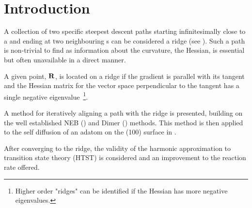 \section{Introduction}
\label{sec:erm-introduction}

A collection of two specific steepest descent paths starting infinitesimally close to a  and ending at two neighbouring s can be considered a ridge (see ).
Such a path is non-trivial to find as information about the curvature, the Hessian, is essential but often unavailable in a direct manner.

A given point, ${\mathrm{\mathbf{\bm{R}}}}$, is located on a ridge if the gradient is parallel with its tangent and the Hessian matrix for the vector space perpendicular to the tangent has a single negative eigenvalue~\footnote{Higher order "ridges" can be identified if the Hessian has more negative eigenvalues.}.

A method for iteratively aligning a path with the ridge is presented, building on the well established NEB () and Dimer () methods.
This method is then applied to the self diffusion of an adatom on the (100) surface in .

After converging to the ridge, the validity of the harmonic approximation to transition state theory (HTST) is considered and an improvement to the reaction rate offered.

